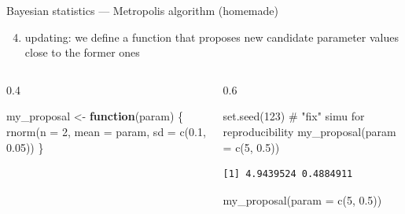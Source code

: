 \documentclass[
  ignorenonframetext,
  aspectratio=169,
  t]{beamer}
\newenvironment{Shaded}{\begin{snugshade}}{\end{snugshade}}
\newcommand{\AttributeTok}[1]{\textcolor[rgb]{0.40,0.45,0.13}{#1}}
\newcommand{\CommentTok}[1]{\textcolor[rgb]{0.37,0.37,0.37}{#1}}
\newcommand{\ControlFlowTok}[1]{\textcolor[rgb]{0.00,0.23,0.31}{\textbf{#1}}}
\newcommand{\DecValTok}[1]{\textcolor[rgb]{0.68,0.00,0.00}{#1}}
\newcommand{\FloatTok}[1]{\textcolor[rgb]{0.68,0.00,0.00}{#1}}
\newcommand{\FunctionTok}[1]{\textcolor[rgb]{0.28,0.35,0.67}{#1}}
\newcommand{\NormalTok}[1]{\textcolor[rgb]{0.00,0.23,0.31}{#1}}
\newcommand{\OtherTok}[1]{\textcolor[rgb]{0.00,0.23,0.31}{#1}}
\providecommand{\tightlist}{%
  \setlength{\itemsep}{0pt}\setlength{\parskip}{0pt}}
\newcommand{\bluenorm}[1]{\textcolor{bluebeamer}{#1}}
\begin{document}
\begin{frame}[fragile]{Bayesian statistics --- Metropolis algorithm
(homemade)}
\protect{}\label{bayesian-statistics-metropolis-algorithm-homemade-3}
\begin{enumerate}
\setcounter{enumi}{3}
\tightlist
\item
  \bluenorm{updating}: we define a function that proposes new candidate
  parameter values close to the former ones
\end{enumerate}

\begin{columns}[T]
\begin{column}{0.4\linewidth}
\footnotesize

\begin{Shaded}
\begin{Highlighting}[]
\NormalTok{my\_proposal }\OtherTok{\textless{}{-}} \ControlFlowTok{function}\NormalTok{(param) \{}
  \FunctionTok{rnorm}\NormalTok{(}\AttributeTok{n =} \DecValTok{2}\NormalTok{,}
        \AttributeTok{mean =}\NormalTok{ param,}
        \AttributeTok{sd =} \FunctionTok{c}\NormalTok{(}\FloatTok{0.1}\NormalTok{, }\FloatTok{0.05}\NormalTok{))}
\NormalTok{\}}
\end{Highlighting}
\end{Shaded}

\normalsize
\end{column}

\begin{column}{0.6\linewidth}
\footnotesize

\begin{Shaded}
\begin{Highlighting}[]
\FunctionTok{set.seed}\NormalTok{(}\DecValTok{123}\NormalTok{) }\CommentTok{\# "fix" simu for reproducibility}
\FunctionTok{my\_proposal}\NormalTok{(}\AttributeTok{param =} \FunctionTok{c}\NormalTok{(}\DecValTok{5}\NormalTok{, }\FloatTok{0.5}\NormalTok{))}
\end{Highlighting}
\end{Shaded}

\begin{verbatim}
[1] 4.9439524 0.4884911
\end{verbatim}

\begin{Shaded}
\begin{Highlighting}[]
\FunctionTok{my\_proposal}\NormalTok{(}\AttributeTok{param =} \FunctionTok{c}\NormalTok{(}\DecValTok{5}\NormalTok{, }\FloatTok{0.5}\NormalTok{))}
\end{Highlighting}
\end{Shaded}


\end{column}
\end{columns}
\end{frame}
\end{document}
